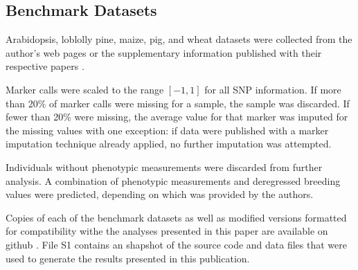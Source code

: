 \documentclass[9pt,twocolumn,twoside]{g3_article/gsag3jnl}
\begin{document}
\subsection*{Benchmark Datasets}

Arabidopsis, loblolly pine, maize, pig, and wheat datasets were collected from the author's web pages
or the supplementary information published with their respective papers \citep{loudet2002, resende2012, crossa2010, cleveland2012, thavamanikumar2015}.

Marker calls were scaled to the range $[-1, 1]$ for all SNP information. If more than 20\% of
marker calls were missing for a sample, the sample was discarded. If fewer than 20\% were missing,
the average value for that marker was imputed for the missing values with one exception: if data were 
published with a marker imputation technique already applied, no further imputation was attempted.

Individuals without phenotypic measurements were discarded from further analysis. A combination of phenotypic 
measurements and deregressed breeding values were predicted, depending on which was provided by the authors.


Copies of each of the benchmark datasets as well as modified versions formatted for compatibility withe the analyses
presented in this paper are available on github \citep{mcdowell2016}. File S1 contains an shapshot of the 
source code and data files that were used to generate the results presented in this publication.

%
\end{document}
